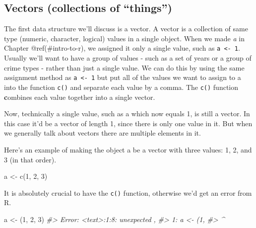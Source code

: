 \documentclass[
]{krantz}
\makeatletter
\newenvironment{Shaded}{\begin{snugshade}}{\end{snugshade}}
\newcommand{\CommentTok}[1]{\textcolor[rgb]{0.37,0.37,0.37}{\textit{#1}}}
\newcommand{\DecValTok}[1]{\textcolor[rgb]{0.06,0.06,0.06}{#1}}
\newcommand{\FunctionTok}[1]{\textcolor[rgb]{0,0,0}{#1}}
\newcommand{\NormalTok}[1]{#1}
\newcommand{\OtherTok}[1]{\textcolor[rgb]{0.37,0.37,0.37}{#1}}
\newenvironment{kframe}{%
\medskip{}
\setlength{\fboxsep}{.8em}
 \def\at@end@of@kframe{}%
 \ifinner\ifhmode%
  \def\at@end@of@kframe{\end{minipage}}%
  \begin{minipage}{\columnwidth}%
 \fi\fi%
 \def\FrameCommand##1{\hskip\@totalleftmargin \hskip-\fboxsep
 \colorbox{shadecolor}{##1}\hskip-\fboxsep
     \hskip-\linewidth \hskip-\@totalleftmargin \hskip\columnwidth}%
 \MakeFramed {\advance\hsize-\width
   \@totalleftmargin\z@ \linewidth\hsize
   \@setminipage}}%
 {\par\unskip\endMakeFramed%
 \at@end@of@kframe}
\renewenvironment{Shaded}{\begin{kframe}}{\end{kframe}}
\makeatother
\begin{document}
\hypertarget{vectors}{%
\subsection{Vectors (collections of ``things'')}\label{vectors}}

The first data structure we'll discuss is a vector. A vector is a collection of same type (numeric, character, logical) values in a single object. When we made \emph{a} in Chapter @ref(\#intro-to-r), we assigned it only a single value, such as \texttt{a\ \textless{}-\ 1}. Usually we'll want to have a group of values - such as a set of years or a group of crime types - rather than just a single value. We can do this by using the same assignment method as \texttt{a\ \textless{}-\ 1} but put all of the values we want to assign to a into the function \texttt{c()} and separate each value by a comma. The \texttt{c()} function \textbf{c}ombines each value together into a single vector.

Now, technically a single value, such as a which now equals 1, is still a vector. In this case it'd be a vector of length 1, since there is only one value in it. But when we generally talk about vectors there are multiple elements in it.

Here's an example of making the object a be a vector with three values: 1, 2, and 3 (in that order).

\begin{Shaded}
\begin{Highlighting}[]
\NormalTok{a }\OtherTok{\textless{}{-}} \FunctionTok{c}\NormalTok{(}\DecValTok{1}\NormalTok{, }\DecValTok{2}\NormalTok{, }\DecValTok{3}\NormalTok{)}
\end{Highlighting}
\end{Shaded}

It is absolutely crucial to have the \texttt{c()} function, otherwise we'd get an error from R.

\begin{Shaded}
\begin{Highlighting}[]
\NormalTok{a }\OtherTok{\textless{}{-}}\NormalTok{ (}\DecValTok{1}\NormalTok{, }\DecValTok{2}\NormalTok{, }\DecValTok{3}\NormalTok{)}
\CommentTok{\#\textgreater{} Error: \textless{}text\textgreater{}:1:8: unexpected \textquotesingle{},\textquotesingle{}}
\CommentTok{\#\textgreater{} 1: a \textless{}{-} (1,}
\CommentTok{\#\textgreater{}            \^{}}
\end{Highlighting}
\end{Shaded}
\end{document}
